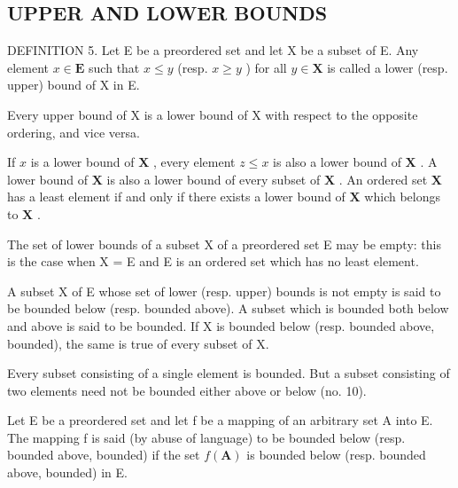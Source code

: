 \subsection{UPPER AND LOWER BOUNDS}

DEFINITION 5. Let E be a preordered set and let X be a subset of E. Any element \(x \in \mathbf{E}\) such that \(x \leqslant y\) (resp. \(x \geqslant y\) ) for all \(y \in \mathbf{X}\) is called a lower (resp. upper) bound of X in E.

Every upper bound of X is a lower bound of X with respect to the opposite ordering, and vice versa.

If \(x\) is a lower bound of \(\mathbf{X}\) , every element \(z \leqslant x\) is also a lower bound of \(\mathbf{X}\) . A lower bound of \(\mathbf{X}\) is also a lower bound of every subset of \(\mathbf{X}\) . An ordered set \(\mathbf{X}\) has a least element if and only if there exists a lower bound of \(\mathbf{X}\) which belongs to \(\mathbf{X}\) .

The set of lower bounds of a subset X of a preordered set E may be empty: this is the case when X = E and E is an ordered set which has no least element.

A subset X of E whose set of lower (resp. upper) bounds is not empty is said to be bounded below (resp. bounded above). A subset which is bounded both below and above is said to be bounded. If X is bounded below (resp. bounded above, bounded), the same is true of every subset of X.

Every subset consisting of a single element is bounded. But a subset consisting of two elements need not be bounded either above or below (no. 10).

Let E be a preordered set and let f be a mapping of an arbitrary set A into E. The mapping f is said (by abuse of language) to be bounded below (resp. bounded above, bounded) if the set \(f(\mathbf{A})\) is bounded below (resp. bounded above, bounded) in E.

